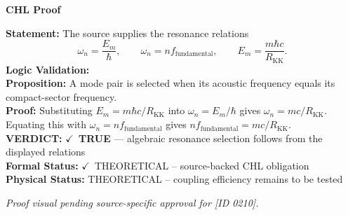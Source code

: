 \vspace{0.45em}
\noindent\textbf{CHL Proof}\par
\textbf{Statement:} The source supplies the resonance relations
\[
\omega_n=\frac{E_m}{\hbar},\qquad \omega_n=n f_{\mathrm{fundamental}},\qquad E_m=\frac{m\hbar c}{R_{\mathrm{KK}}}.
\]
\textbf{Logic Validation:}\\
\textbf{Proposition:} A mode pair is selected when its acoustic frequency equals its compact-sector frequency.\\
\textbf{Proof:} Substituting \(E_m=m\hbar c/R_{\mathrm{KK}}\) into \(\omega_n=E_m/\hbar\) gives \(\omega_n=m c/R_{\mathrm{KK}}\). Equating this with \(\omega_n=n f_{\mathrm{fundamental}}\) gives \(n f_{\mathrm{fundamental}}=m c/R_{\mathrm{KK}}\).\\
\textbf{VERDICT:} \ensuremath{\checkmark}\ \textbf{TRUE} --- algebraic resonance selection follows from the displayed relations\\
\textbf{Formal Status:} \ensuremath{\checkmark}\ THEORETICAL -- source-backed CHL obligation\\
\textbf{Physical Status:} THEORETICAL -- coupling efficiency remains to be tested
\par\vspace{0.45em}
\par
\vfill
\begingroup\footnotesize\itshape
Proof visual pending source-specific approval for [ID 0210].
\par\endgroup
\vfill
\endgroup
\endgroup
